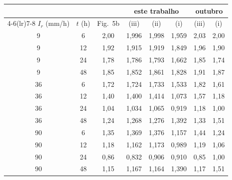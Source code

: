 \begin{tabular}{cccccccc}
\toprule
 & & & \multicolumn{3}{c}{este trabalho} & \multicolumn{2}{c}{outubro}\\
\cmidrule(lr){4-6}\cmidrule(lr){7-8}
$I_r$ (mm/h) & $t$ (h) & Fig.~5b & (iii) & (ii) & (i) & (iii) & (i)\\
\midrule
9 & 6 & 2{,}00 & 1{,}996 & 1{,}998 & 1{,}959 & 2{,}03 & 2{,}00\\
9 & 12 & 1{,}92 & 1{,}915 & 1{,}919 & 1{,}849 & 1{,}96 & 1{,}90\\
9 & 24 & 1{,}78 & 1{,}786 & 1{,}793 & 1{,}662 & 1{,}85 & 1{,}74\\
9 & 48 & 1{,}85 & 1{,}852 & 1{,}861 & 1{,}828 & 1{,}91 & 1{,}87\\
\midrule
36 & 6 & 1{,}72 & 1{,}724 & 1{,}733 & 1{,}533 & 1{,}82 & 1{,}61\\
36 & 12 & 1{,}40 & 1{,}400 & 1{,}414 & 1{,}073 & 1{,}57 & 1{,}18\\
36 & 24 & 1{,}04 & 1{,}034 & 1{,}065 & 0{,}919 & 1{,}18 & 1{,}00\\
36 & 48 & 1{,}24 & 1{,}268 & 1{,}276 & 1{,}392 & 1{,}33 & 1{,}51\\
\midrule
90 & 6 & 1{,}35 & 1{,}369 & 1{,}376 & 1{,}157 & 1{,}44 & 1{,}24\\
90 & 12 & 1{,}18 & 1{,}162 & 1{,}173 & 0{,}989 & 1{,}19 & 1{,}06\\
90 & 24 & 0{,}86 & 0{,}832 & 0{,}906 & 0{,}910 & 0{,}85 & 1{,}00\\
90 & 48 & 1{,}15 & 1{,}167 & 1{,}164 & 1{,}390 & 1{,}17 & 1{,}51\\
\bottomrule
\end{tabular}
